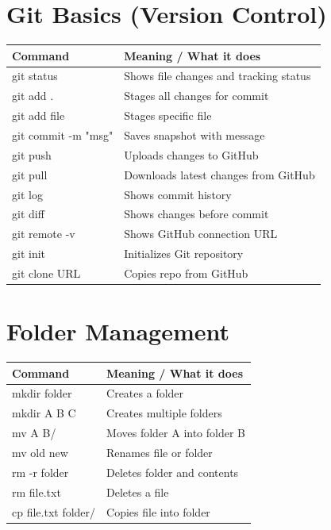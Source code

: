 \documentclass[11pt]{article}
\begin{document}
\vspace{0.6cm}

\section*{Git Basics (Version Control)}

\begin{tabular}{|p{5.5cm}|p{9cm}|}
\hline
\textbf{Command} & \textbf{Meaning / What it does} \\
\hline
git status & Shows file changes and tracking status \\
git add . & Stages all changes for commit \\
git add file & Stages specific file \\
git commit -m "msg" & Saves snapshot with message \\
git push & Uploads changes to GitHub \\
git pull & Downloads latest changes from GitHub \\
git log & Shows commit history \\
git diff & Shows changes before commit \\
git remote -v & Shows GitHub connection URL \\
git init & Initializes Git repository \\
git clone URL & Copies repo from GitHub \\
\hline
\end{tabular}

\vspace{0.6cm}

\section*{Folder Management}

\begin{tabular}{|p{5.5cm}|p{9cm}|}
\hline
\textbf{Command} & \textbf{Meaning / What it does} \\
\hline
mkdir folder & Creates a folder \\
mkdir A B C & Creates multiple folders \\
mv A B/ & Moves folder A into folder B \\
mv old new & Renames file or folder \\
rm -r folder & Deletes folder and contents \\
rm file.txt & Deletes a file \\
cp file.txt folder/ & Copies file into folder \\
\hline
\end{tabular}
\end{document}
